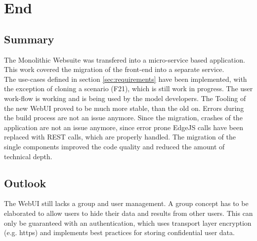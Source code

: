 
\chapter{End}



\section{Summary}
The Monolithic Websuite was transfered into a micro-service based application. This work covered the migration of the front-end into a separate service.\\
The use-cases defined in section \ref{sec:requirements} have been implemented, with the exception of cloning a scenario (F21), which is still work in progress. The user work-flow is working and is being used by the model developers. The Tooling of the new WebUI proved to be much more stable, than the old on. Errors during the build process are not an issue anymore. Since the migration, crashes of the application are not an issue anymore, since error prone EdgeJS calls have been replaced with REST calls, which are properly handled. The migration of the single components improved the code quality and reduced the amount of technical depth.


\section{Outlook}
The WebUI still lacks a group and user management. A group concept has to be elaborated to allow users to hide their data and results from other users. This can only be guaranteed with an authentication, which uses transport layer encryption (e.g. https) and implements best practices for storing confidential user data.
